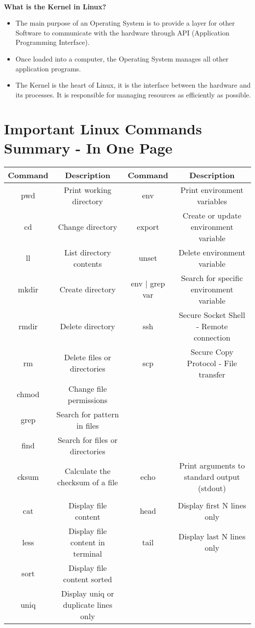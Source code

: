 \documentclass{article}
\begin{document}
\paragraph{} \textbf{What is the Kernel in Linux?}
\begin{itemize}
	\item The main purpose of an Operating System is to provide a layer for other Software to communicate with the hardware through API (Application Programming Interface).
	\item Once loaded into a computer, the Operating System manages all other application programs.
	\item The Kernel is the heart of Linux, it is the interface between the hardware and its processes. It is responsible for managing resources as efficiently as possible.
\end{itemize}


\newpage
\section{Important Linux Commands Summary - In One Page}
	
	{\fontsize{8pt}{12pt}\selectfont
		\begin{tabular}{ c c || c c }
		\hline
		\textbf{Command} & \textbf{Description} & \textbf{Command} & \textbf{Description} \\ \hline
		pwd & Print working directory & env & Print environment variables \\
		cd & Change directory & export & Create or update environment variable \\
		ll & List directory contents & unset & Delete environment variable \\
		mkdir & Create directory & env | grep var & Search for specific environment variable \\
		rmdir & Delete directory & ssh & Secure Socket Shell - Remote connection \\
		rm & Delete files or directories & scp & Secure Copy Protocol - File transfer \\
		chmod & Change file permissions \\
		grep & Search for pattern in files \\
		find & Search for files or directories \\
		cksum & Calculate the checksum of a file & echo & Print arguments to standard output (stdout) \\
		& \\
		cat & Display file content & head & Display first N lines only \\
		less & Display file content in terminal & tail & Display last N lines only \\
		sort & Display file content sorted \\
		uniq & Display uniq or duplicate lines only \\
	\end{tabular}}
\newline\newline
\end{document}
